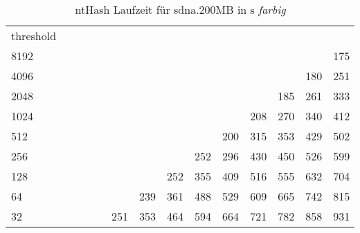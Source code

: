 \begin{table}[h]
	\caption{ntHash Laufzeit für sdna.200MB in s \emph{farbig} }
	\label{tab:my-table}
	\begin{tabular}{lrrrrrrrrrrrrr}
		\multicolumn{1}{r}{threshold} &  &  &  &  &  &  &  &  &  &  &  &  &  \\
		\cline{1-1}
		\multicolumn{1}{|l|}{8192} &  &  &  &  &  &  &  &  &  &  &  &  &
		\cellcolor[HTML]{99E600}175 \\ \cline{1-1}
		\multicolumn{1}{|l|}{4096} &  &  &  &  &  &  &  &  &  &  &  &
		\cellcolor[HTML]{99E600}180 & \cellcolor[HTML]{99E600}251 \\ \cline{1-1}
		\multicolumn{1}{|l|}{2048} &  &  &  &  &  &  &  &  &  &  &
		\cellcolor[HTML]{99E600}185 & \cellcolor[HTML]{99E600}261 &
		\cellcolor[HTML]{99E600}333 \\ \cline{1-1}
		\multicolumn{1}{|l|}{1024} &  &  &  &  &  &  &  &  &  &
		\cellcolor[HTML]{99E600}208 & \cellcolor[HTML]{99E600}270 &
		\cellcolor[HTML]{99E600}340 & \cellcolor[HTML]{E69900}412 \\ \cline{1-1}
		\multicolumn{1}{|l|}{512} &  &  &  &  &  &  &  &  &
		\cellcolor[HTML]{99E600}200 & \cellcolor[HTML]{99E600}315 &
		\cellcolor[HTML]{99E600}353 & \cellcolor[HTML]{E69900}429 &
		\cellcolor[HTML]{E69900}502 \\ \cline{1-1}
		\multicolumn{1}{|l|}{256} &  &  &  &  &  &  &  &
		\cellcolor[HTML]{99E600}252 & \cellcolor[HTML]{99E600}296 &
		\cellcolor[HTML]{E69900}430 & \cellcolor[HTML]{E69900}450 &
		\cellcolor[HTML]{E69900}526 & \cellcolor[HTML]{E69900}599 \\ \cline{1-1}
		\multicolumn{1}{|l|}{128} &  &  &  &  &  &  &
		\cellcolor[HTML]{99E600}252 & \cellcolor[HTML]{99E600}355 &
		\cellcolor[HTML]{E69900}409 & \cellcolor[HTML]{E69900}516 &
		\cellcolor[HTML]{E69900}555 & \cellcolor[HTML]{E60000}632 &
		\cellcolor[HTML]{E60000}704 \\ \cline{1-1}
		\multicolumn{1}{|l|}{64} &  &  &  &  &  & \cellcolor[HTML]{99E600}239 &
		\cellcolor[HTML]{99E600}361 & \cellcolor[HTML]{E69900}488 &
		\cellcolor[HTML]{E69900}529 & \cellcolor[HTML]{E69900}609 &
		\cellcolor[HTML]{E60000}665 & \cellcolor[HTML]{E60000}742 &
		\cellcolor[HTML]{E60000}815 \\ \cline{1-1}
		\multicolumn{1}{|l|}{32} &  &  &  &  & \cellcolor[HTML]{99E600}251 &
		\cellcolor[HTML]{99E600}353 & \cellcolor[HTML]{E69900}464 &
		\cellcolor[HTML]{E69900}594 & \cellcolor[HTML]{E60000}664 &
		\cellcolor[HTML]{E60000}721 & \cellcolor[HTML]{E60000}782 &
		\cellcolor[HTML]{E60000}858 & \cellcolor[HTML]{9900E6}931 \\ \cline{1-1}

\end{tabular}
\end{table}

